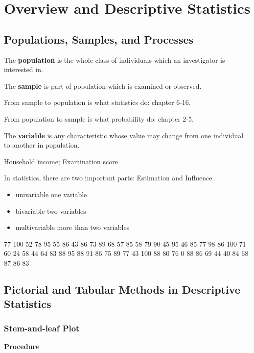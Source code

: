 \chapter{Overview and Descriptive Statistics}
\section{Populations, Samples, and Processes}
\begin{defn}
The \textbf{population} is the whole class of individuals which an investigator  is interested in.
\end{defn}

\begin{defn}
The \textbf{sample} is part of population which is examined or observed.
\end{defn}

From sample to population is what statistics do: chapter 6-16.

From population to sample is what probability do: chapter 2-5.
\begin{defn}
The \textbf{variable} is any characteristic whose value may change from one individual to another in population.
\end{defn}

\begin{exmp}
Household income; Examination score
\end{exmp}

In statistics, there are two important parts: Estimation and Influence.
\begin{itemize}
\item univariable one variable
\item bivariable two variables
\item multivariable more than two variables
\end{itemize}
\begin{exmp}
  77 100 52 78 95 55 86 43 86 73 89 68 57 85 58 79 90 45 95 46 85 77 98 86
  100 71 60 24 58 44 64 83 88 95 88 91 86 75 89 77 43 100 88 80 76 0 88 86
  69 44 40 84 68 87 86 83
\end{exmp}

\section{Pictorial and Tabular Methods in Descriptive Statistics}

\subsection{Stem-and-leaf Plot}
\textbf{Procedure}

